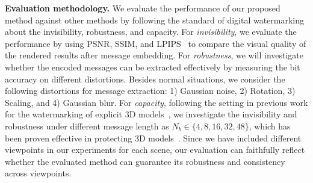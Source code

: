 \documentclass[10pt,twocolumn,letterpaper]{article}
\newcommand{\Sref}[1]{Section~\ref{#1}}
\begin{document}

\noindent\textbf{Evaluation methodology.} We evaluate the performance of our proposed method against other methods by following the standard of digital watermarking about the invisibility, robustness, and capacity. For \textit{invisibility}, we evaluate the performance by using PSNR, SSIM, and LPIPS~\cite{zhang2018unreasonable} to compare the visual quality of the rendered results after message embedding. For \textit{robustness}, we will investigate whether the encoded messages can be extracted effectively by measuring the bit accuracy on different distortions. Besides normal situations, we consider the following distortions for message extraction: 1) Gaussian noise, 2) Rotation, 3) Scaling, and 4) Gaussian blur. For \textit{capacity}, following the setting in previous work for the watermarking of explicit 3D models~\cite{Yoo_2022_CVPR}, we investigate the invisibility and robustness under different message length as $N_b\in\{4, 8, 16, 32, 48\}$, which has been proven effective in protecting 3D models~\cite{Yoo_2022_CVPR}. Since we have included different viewpoints in our experiments for each scene, our evaluation can faithfully reflect whether the evaluated method can guarantee its robustness and consistency across viewpoints. 


\end{document}
